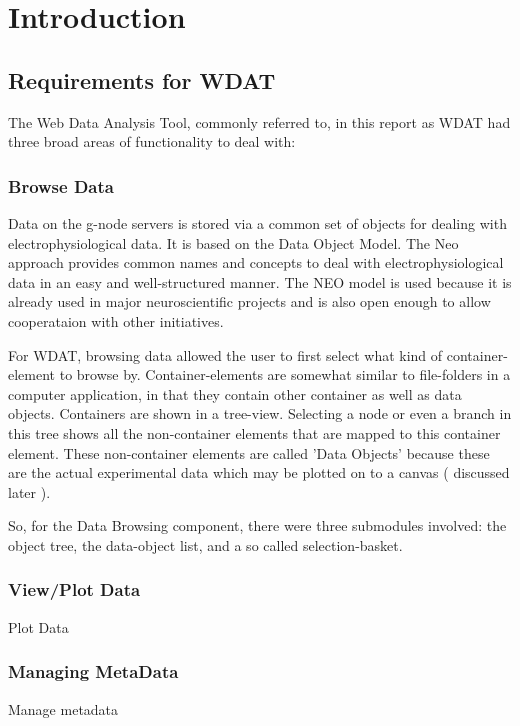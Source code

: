 \chapter{Introduction}

\section{Requirements for WDAT}

The Web Data Analysis Tool, commonly referred to, in this report as
WDAT had three broad areas of functionality to deal with: 

\subsection{Browse Data}

Data on the g-node servers is stored via a common set of objects
for dealing with electrophysiological data.  It is based on the
 Data
Object Model.  The Neo approach provides common names and concepts to
deal with electrophysiological data in an easy and well-structured
manner.  The NEO model is used because it is already used in major
neuroscientific projects and is also open enough to allow cooperataion
with other initiatives.

For WDAT, browsing data allowed the user to first select what kind of
container-element to browse by.  Container-elements are somewhat
similar to file-folders in a computer application, in that they
contain other container as well as data objects.  Containers are
shown in a tree-view.  Selecting a node or even a branch in this tree
shows all the non-container elements that are mapped to this container
element.  These non-container elements are called 'Data Objects' because
these are the actual experimental data which may be plotted on to a
canvas ( discussed later ).

So, for the Data Browsing component, there were three submodules
involved: the object tree, the data-object list, and a so called
selection-basket.

\subsection{View/Plot Data}

Plot Data

\subsection{Managing MetaData}

Manage metadata


